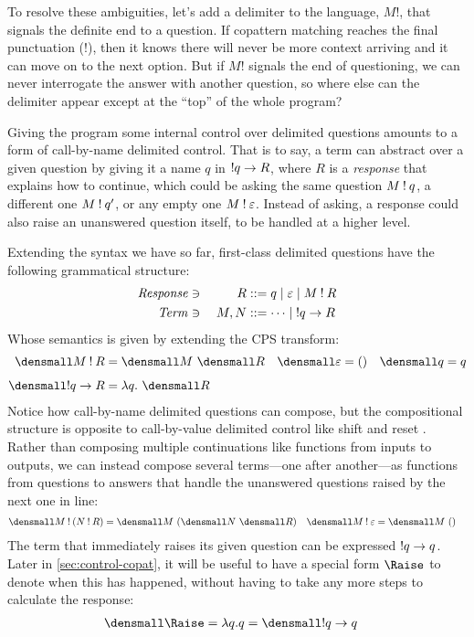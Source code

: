 \documentclass[sigplan,screen]{acmart}
\begin{document}
To resolve these ambiguities, let's add a delimiter to the language, $M!$, that
signals the definite end to a question.  If copattern matching reaches the final
punctuation ($!$), then it knows there will never be more context arriving and
it can move on to the next option.  But if $M!$ signals the end of questioning,
we can never interrogate the answer with another question, so where else can the
delimiter appear except at the ``top'' of the whole program?

Giving the program some internal control over delimited questions amounts to a
form of call-by-name delimited control.  That is to say, a term can abstract
over a given question by giving it a name $q$ in $\mathbin{!} q \to R$, where $R$ is a
\emph{response} that explains how to continue, which could be asking the same
question $M \mathbin{!} q$, a different one $M \mathbin{!} q'$, or any empty one
$M \mathbin{!} \varepsilon$.  Instead of asking, a response could also raise an
unanswered question itself, to be handled at a higher level.

Extending the syntax we have so far, first-class delimited questions have the
following grammatical structure:
\begin{alignat*}{2}
  \mathit{Response} &\ni{}& R
  &::= q
  \mid \varepsilon
  \mid M \mathbin{!} R
  \\
  \mathit{Term} &\ni{}& M, N
  &::= \dots
  \mid \mathbin{!} q \to R
\end{alignat*}
Whose semantics is given by extending the CPS transform:
\begin{align*}
  \den{M \ans R}
  &=
  \den{M} ~ \den{R}
  &
  \den{\varepsilon}
  &=
  ()
  &
  \den{q}
  &=
  q
  \\[1ex]
  \den{\ans q \to R}
  &=
  \lambda q.~ \den{R}
\end{align*}
Notice how call-by-name delimited questions can compose, but the compositional
structure is opposite to call-by-value delimited control like shift and reset
\cite{AbstractingControl,FunctionalAbstractionTypedContexts}.  Rather than
composing multiple continuations like functions from inputs to outputs, we can
instead compose several terms---one after another---as functions from questions
to answers that handle the unanswered questions raised by the next one in line:
\begin{align*}
  \den{M \ans (N \ans R)}
  &=
  \den{M} ~ (\den{N} ~ \den{R})
  &
  \den{M \ans \varepsilon}
  &=
  \den{M} ~ ()
\end{align*}
The term that immediately raises its given question can be expressed
$\mathbin{!} q \to q$.  Later in \cref{sec:control-copat}, it will be useful to have a
special form $\Raise$ to denote when this has happened, without having to take
any more steps to calculate the response:
\begin{align*}
  \den{\Raise}
  &=
  \lambda q. q
  = \den{\ans q \to q}
\end{align*}
\end{document}
